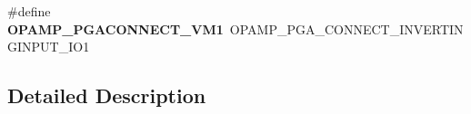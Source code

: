 \begin{DoxyCompactItemize}
\item 
\hypertarget{group___h_a_l___o_p_a_m_p___aliased___defines_ga8a371a8519c5350bba225e66b4d82ef1}{\#define {\bfseries O\-P\-A\-M\-P\-\_\-\-P\-G\-A\-C\-O\-N\-N\-E\-C\-T\-\_\-\-V\-M1}~O\-P\-A\-M\-P\-\_\-\-P\-G\-A\-\_\-\-C\-O\-N\-N\-E\-C\-T\-\_\-\-I\-N\-V\-E\-R\-T\-I\-N\-G\-I\-N\-P\-U\-T\-\_\-\-I\-O1}\label{group___h_a_l___o_p_a_m_p___aliased___defines_ga8a371a8519c5350bba225e66b4d82ef1}

\end{DoxyCompactItemize}


\subsection{Detailed Description}
